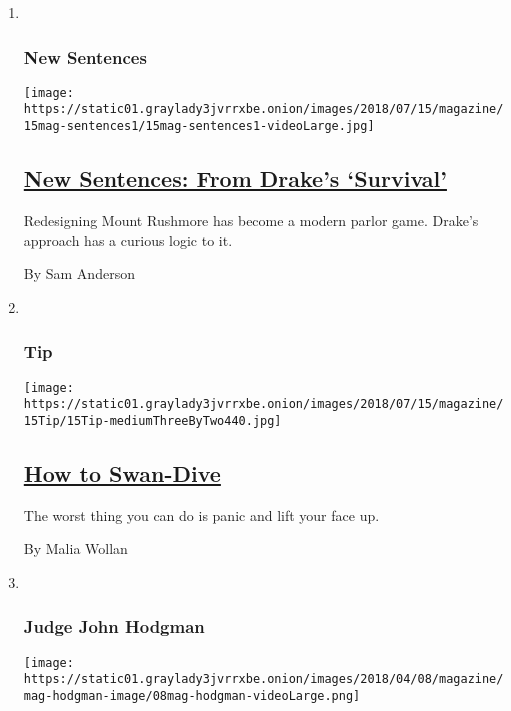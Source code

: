 \begin{enumerate}
\def\labelenumi{\arabic{enumi}.}
\item ~
  \hypertarget{new-sentences}{%
  \subsubsection{New Sentences}\label{new-sentences}}

  \texttt{[image: https://static01.graylady3jvrrxbe.onion/images/2018/07/15/magazine/15mag-sentences1/15mag-sentences1-videoLarge.jpg]}

  \hypertarget{new-sentences-from-drakes-survival}{%
  \subsection{\texorpdfstring{\href{/2018/07/11/magazine/new-sentences-from-drakes-survival.html}{New
  Sentences: From Drake's
  `Survival'}}{New Sentences: From Drake's `Survival'}}\label{new-sentences-from-drakes-survival}}

  Redesigning Mount Rushmore has become a modern parlor game. Drake's
  approach has a curious logic to it.

  By Sam Anderson
\item ~
  \hypertarget{tip}{%
  \subsubsection{Tip}\label{tip}}

  \texttt{[image: https://static01.graylady3jvrrxbe.onion/images/2018/07/15/magazine/15Tip/15Tip-mediumThreeByTwo440.jpg]}

  \hypertarget{how-to-swan-dive}{%
  \subsection{\texorpdfstring{\href{/2018/07/11/magazine/how-to-swan-dive.html}{How
  to Swan-Dive}}{How to Swan-Dive}}\label{how-to-swan-dive}}

  The worst thing you can do is panic and lift your face up.

  By Malia Wollan
\item ~
  \hypertarget{judge-john-hodgman}{%
  \subsubsection{Judge John Hodgman}\label{judge-john-hodgman}}

  \texttt{[image: https://static01.graylady3jvrrxbe.onion/images/2018/04/08/magazine/mag-hodgman-image/08mag-hodgman-videoLarge.png]}


\end{enumerate}
